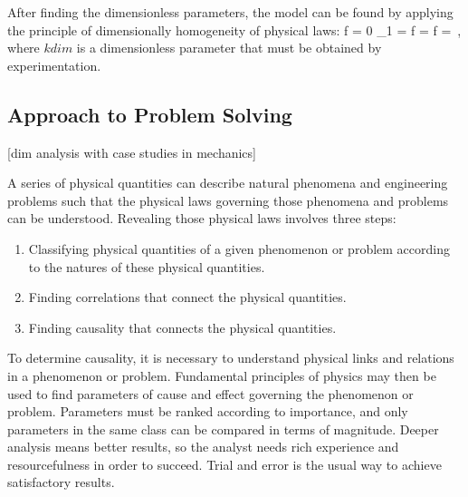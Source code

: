 After finding the dimensionless parameters, the model can be found by applying the principle of dimensionally homogeneity of physical laws:
\beq
f = 0\implies
\kdim_1 = f\implies 
{} = f\implies
{} = \kdim{}\,,
\eeq
where $kdim$ is a dimensionless parameter that must be obtained by experimentation.


\subsection{Approach to Problem Solving}

[dim analysis with case studies in mechanics]

A series of physical quantities can describe natural phenomena and engineering problems such that the physical laws governing those phenomena and problems can be understood. Revealing those physical laws involves three steps:
\begin{enumerate}
\item Classifying physical quantities of a given phenomenon or problem according to the natures of these physical quantities.
\item Finding correlations that connect the physical quantities.
\item Finding causality that connects the physical quantities.
\end{enumerate}
To determine causality, it is necessary to understand physical links and relations in a phenomenon or problem. Fundamental principles of physics may then be used to find parameters of cause and effect governing the phenomenon or problem. Parameters must be ranked according to importance, and only parameters in the same class can be compared in terms of magnitude. Deeper analysis means better results, so the analyst needs rich experience and resourcefulness in order to succeed. Trial and error is the usual way to achieve satisfactory results.


